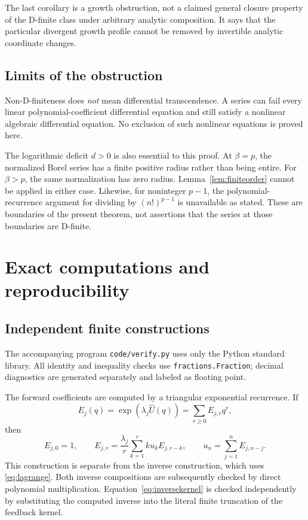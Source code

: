 \documentclass[11pt,a4paper]{article}
\numberwithin{equation}{section}
\theoremstyle{definition}
\theoremstyle{remark}
\newcommand{\U}{\widehat U}
\begin{document}
The last corollary is a growth obstruction, not a claimed general
closure property of the D-finite class under arbitrary analytic
composition. It says that the particular divergent growth profile
cannot be removed by invertible analytic coordinate changes.

\subsection{Limits of the obstruction}

Non-D-finiteness does \emph{not} mean differential transcendence. A
series can fail every linear polynomial-coefficient differential
equation and still satisfy a nonlinear algebraic differential equation.
No exclusion of such nonlinear equations is proved here.

The logarithmic deficit $d>0$ is also essential to this proof. At
$\beta=p$, the normalized Borel series has a finite positive radius
rather than being entire. For $\beta>p$, the same normalization has
zero radius. Lemma~\ref{lem:finiteorder} cannot be applied in either
case. Likewise, for noninteger $p-1$, the polynomial-recurrence
argument for dividing by $(n!)^{p-1}$ is unavailable as stated. These
are boundaries of the present theorem, not assertions that the series
at those boundaries are D-finite.

\section{Exact computations and reproducibility}
\label{sec:verification}

\subsection{Independent finite constructions}

The accompanying program \texttt{code/verify.py} uses only the Python
standard library. All identity and inequality checks use
\texttt{fractions.Fraction}; decimal diagnostics are generated
separately and labeled as floating point.

The forward coefficients are computed by a triangular exponential
recurrence. If
\[
 E_j(q)=\exp(\lambda_j\U(q))=\sum_{r\ge0}E_{j,r}q^r,
\]
then
\begin{equation}
 E_{j,0}=1,\qquad
 E_{j,r}=\frac{\lambda_j}{r}\sum_{k=1}^r k u_kE_{j,r-k},\qquad
 u_n=\sum_{j=1}^nE_{j,n-j}.
 \label{eq:verificationrecurrence}
\end{equation}
This construction is separate from the inverse construction, which uses
\eqref{eq:lagrange}. Both inverse compositions are subsequently checked
by direct polynomial multiplication. Equation~\eqref{eq:inversekernel}
is checked independently by substituting the computed inverse into the
literal finite truncation of the feedback kernel.
\end{document}
